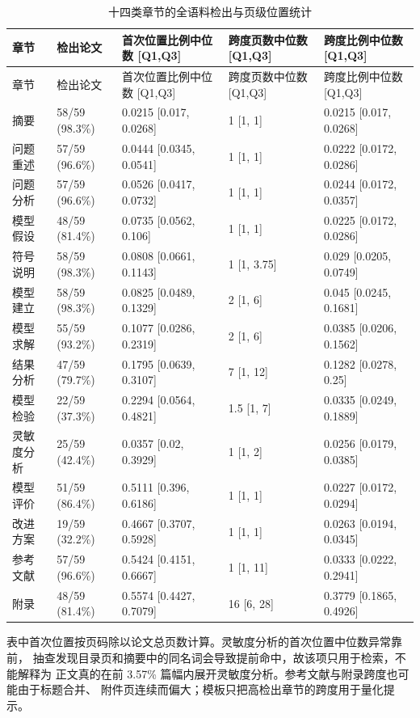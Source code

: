 \documentclass[UTF8,a4paper,12pt]{ctexart}
\begin{document}
\begin{longtable}{p{1.8cm}p{2.5cm}p{3.0cm}p{2.8cm}p{3.0cm}}
\caption{十四类章节的全语料检出与页级位置统计}\label{tab:section-stats}\\
\toprule
章节 & 检出论文 & 首次位置比例中位数 [Q1,Q3] & 跨度页数中位数 [Q1,Q3] & 跨度比例中位数 [Q1,Q3]\\
\midrule
\endfirsthead
\toprule
章节 & 检出论文 & 首次位置比例中位数 [Q1,Q3] & 跨度页数中位数 [Q1,Q3] & 跨度比例中位数 [Q1,Q3]\\
\midrule
\endhead
摘要 & 58/59 (98.3\%) & 0.0215 [0.017, 0.0268] & 1 [1, 1] & 0.0215 [0.017, 0.0268]\\
问题重述 & 57/59 (96.6\%) & 0.0444 [0.0345, 0.0541] & 1 [1, 1] & 0.0222 [0.0172, 0.0286]\\
问题分析 & 57/59 (96.6\%) & 0.0526 [0.0417, 0.0732] & 1 [1, 1] & 0.0244 [0.0172, 0.0357]\\
模型假设 & 48/59 (81.4\%) & 0.0735 [0.0562, 0.106] & 1 [1, 1] & 0.0225 [0.0172, 0.0286]\\
符号说明 & 58/59 (98.3\%) & 0.0808 [0.0661, 0.1143] & 1 [1, 3.75] & 0.029 [0.0205, 0.0749]\\
模型建立 & 58/59 (98.3\%) & 0.0825 [0.0489, 0.1329] & 2 [1, 6] & 0.045 [0.0245, 0.1681]\\
模型求解 & 55/59 (93.2\%) & 0.1077 [0.0286, 0.2319] & 2 [1, 6] & 0.0385 [0.0206, 0.1562]\\
结果分析 & 47/59 (79.7\%) & 0.1795 [0.0639, 0.3107] & 7 [1, 12] & 0.1282 [0.0278, 0.25]\\
模型检验 & 22/59 (37.3\%) & 0.2294 [0.0564, 0.4821] & 1.5 [1, 7] & 0.0335 [0.0249, 0.1889]\\
灵敏度分析 & 25/59 (42.4\%) & 0.0357 [0.02, 0.3929] & 1 [1, 2] & 0.0256 [0.0179, 0.0385]\\
模型评价 & 51/59 (86.4\%) & 0.5111 [0.396, 0.6186] & 1 [1, 1] & 0.0227 [0.0172, 0.0294]\\
改进方案 & 19/59 (32.2\%) & 0.4667 [0.3707, 0.5928] & 1 [1, 1] & 0.0263 [0.0194, 0.0345]\\
参考文献 & 57/59 (96.6\%) & 0.5424 [0.4151, 0.6667] & 1 [1, 11] & 0.0333 [0.0222, 0.2941]\\
附录 & 48/59 (81.4\%) & 0.5574 [0.4427, 0.7079] & 16 [6, 28] & 0.3779 [0.1865, 0.4926]\\
\bottomrule
\end{longtable}

表中首次位置按页码除以论文总页数计算。灵敏度分析的首次位置中位数异常靠前，
抽查发现目录页和摘要中的同名词会导致提前命中，故该项只用于检索，不能解释为
正文真的在前 3.57\% 篇幅内展开灵敏度分析。参考文献与附录跨度也可能由于标题合并、
附件页连续而偏大；模板只把高检出章节的跨度用于量化提示。
\end{document}
